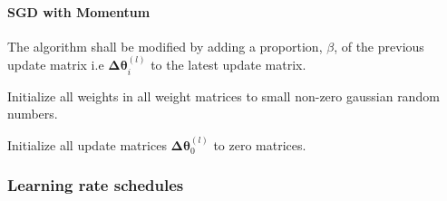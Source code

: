 \documentclass{article}
\begin{document}
\paragraph{SGD with Momentum}

The algorithm shall be modified by adding a proportion, $\beta$, of the previous update matrix i.e $\boldsymbol{\Delta\theta}^{(l)}_i$ to the latest update matrix.

\begin{algorithm}
		\SetAlgoLined
		
		Initialize all weights in all weight matrices to small non-zero gaussian random numbers.
		
		Initialize all update matrices $\boldsymbol{\Delta\theta}^{(l)}_0$ to zero matrices.
		
	
\end{algorithm}
\hfill\newpage

\subsubsection{Learning rate schedules}
\end{document}

